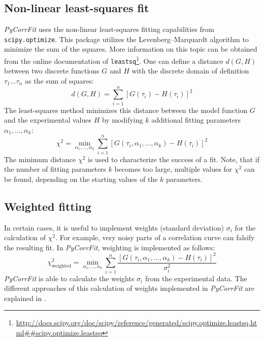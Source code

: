 \subsection{Non-linear least-squares fit}
\label{sec:theor.nonle}
\textit{PyCorrFit} uses the non-linear least-squares fitting capabilities from \texttt{scipy.optimize}. This package utilizes the Levenberg–Marquardt algorithm to minimize the sum of the squares. More information on this topic can be obtained from the online documentation of \texttt{leastsq}\footnote{\url{http://docs.scipy.org/doc/scipy/reference/generated/scipy.optimize.leastsq.html##scipy.optimize.leastsq}}. 
One can define a distance $d(G,H)$ between two discrete functions $G$ and $H$ with the discrete domain of definition $\tau_1 \dots \tau_n$ as the sum of squares:
\begin{equation}
d(G,H) = \sum_{i=1}^n \left[ G(\tau_i) - H(\tau_i) \right]^2
\end{equation}
The least-squares method minimizes this distance between the model function $G$ and the experimental values $H$ by modifying $k$ additional fitting parameters $\alpha_1, \dots, \alpha_k$:
\begin{equation}
\chi^2 = \min_{\alpha_1, \dots, \alpha_k} \sum_{i=1}^n \left[ G(\tau_i,\alpha_1, \dots, \alpha_k) - H(\tau_i) \right]^2
\end{equation}
The minimum distance $\chi^2$ is used to characterize the success of a fit. Note, that if the number of fitting parameters $k$ becomes too large, multiple values for $\chi^2$ can be found, depending on the starting values of the $k$ parameters.


\subsection{Weighted fitting}
\label{sec:theor.weigh}
In certain cases, it is useful to implement weights (standard deviation) $\sigma_i$ for the calculation of $\chi^2$. For example, very noisy parts of a correlation curve can falsify the resulting fit. In \textit{PyCorrFit}, weighting is implemented as follows:
\begin{equation}
\chi^2_\mathrm{weighted} = \min_{\alpha_1, \dots, \alpha_k} \sum_{i=1}^n  \frac{\left[ G(\tau_i,\alpha_1, \dots, \alpha_k) - H(\tau_i) \right]^2}{\sigma_i^2}
\end{equation}
\textit{PyCorrFit} is able to calculate the weights $\sigma_i$ from the experimental data. The different approaches of this calculation of weights implemented in \textit{PyCorrFit} are explained in .



